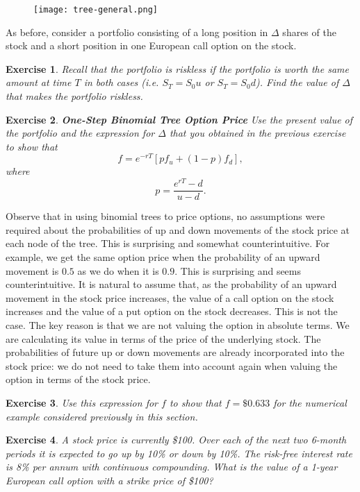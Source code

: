 \documentclass[letterpaper,10pt]{article}
\newtheorem{ex}{Exercise}
\begin{document}
\begin{center}
\begin{figure}[H]
\texttt{[image: tree-general.png]}
\end{figure}
\end{center}

As before, consider a portfolio consisting of a long position in $\Delta$ shares of the stock and a short position in one European call option on the stock.

\begin{ex}
Recall that the portfolio is riskless if the portfolio is worth the same amount at time $T$ in both cases (i.e. $S_T=S_0u$ or $S_T=S_0d$).  Find the value of $\Delta$ that makes the portfolio riskless.
\end{ex}

\begin{ex}\label{option-price}{\bf One-Step Binomial Tree Option Price}
Use the present value of the portfolio and the expression for $\Delta$ that you obtained in the previous exercise to show that $$f=e^{-rT}\left[pf_u+(1-p)f_d\right],$$ where $$p=\frac{e^{rT}-d}{u-d}.$$
\end{ex}


Observe that in using binomial trees to price options, no assumptions were required about the probabilities of up and down movements of the stock price at each node of the tree.  This is surprising and somewhat counterintuitive.  For example, we get the same option price when the probability of an upward movement is $0.5$ as we do when it is $0.9$. This is surprising and seems counterintuitive. It is natural to assume that, as the probability of an upward movement in the stock price increases, the value of a call option on the stock increases and the value of a put option on the stock decreases. This is not the case.  The key reason is that we are not valuing the option in absolute terms. We are calculating its value in terms of the price of the underlying stock. The probabilities of future up or down movements are already incorporated into the stock price: we do not need to take them into account again when valuing the option in terms of the stock price.

\begin{ex}
Use this expression for $f$ to show that $f=\$0.633$ for the numerical example considered previously in this section.
\end{ex}

\begin{ex}
A stock price is currently \$100. Over each of the next two 6-month periods it is expected to go up by 10\% or down by 10\%. The risk-free interest rate is 8\% per annum with continuous compounding. What is the value of a 1-year European call option with a strike price of \$100?
\end{ex}
\end{document}
